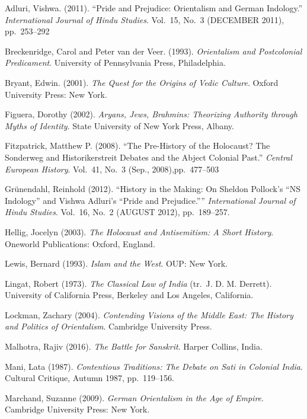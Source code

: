 \begin{thebibliography}{99}
\itemsep=2pt
Adluri, Vishwa. (2011). “Pride and Prejudice: Orientalism and German Indology.” {\sl International Journal of Hindu Studies}. Vol.~15, No.~3 (DECEMBER 2011), 
pp.~253--292

Breckenridge, Carol and Peter van der Veer. (1993). {\sl Orientalism and Postcolonial Predicament}. University of Pennsylvania Press, Philadelphia.

Bryant, Edwin. (2001). {\sl The Quest for the Origins of Vedic Culture}. Oxford University Press: New York.

Figuera, Dorothy (2002). {\sl Aryans, Jews, Brahmins: Theorizing Authority through Myths of Identity}. State University of New York Press, Albany.

Fitzpatrick, Matthew P. (2008). “The Pre-History of the Holocaust? The Sonderweg and Historikerstreit Debates and the Abject Colonial Past.” 
{\sl Central European History}. Vol.~41, No.~3 (Sep., 2008),\break pp.~477--503

Grünendahl, Reinhold (2012). “History in the Making: On Sheldon Pollock’s “NS Indology” and Vishwa Adluri’s “Pride and Prejudice.”” 
{\sl International Journal of Hindu Studies}. Vol.~16, No.~2 (AUGUST 2012), pp.~189--257.

Hellig, Jocelyn (2003). {\sl The Holocaust and Antisemitism: A Short History}. Oneworld Publications: Oxford, England.

Lewis, Bernard (1993). {\sl Islam and the West}. OUP: New York.

Lingat, Robert (1973). {\sl The Classical Law of India} (tr.\ J. D. M. Derrett). University of California Press, Berkeley and Los Angeles, California. 

Lockman, Zachary (2004). {\sl Contending Visions of the Middle East: The History and Politics of Orientalism}. Cambridge University Press.

Malhotra, Rajiv (2016). {\sl The Battle for Sanskrit}. Harper Collins, India.

Mani, Lata (1987). {\sl Contentious Traditions: The Debate on Sati in Colonial India}. Cultural Critique, Autumn 1987, pp.~119--156.

Marchand, Suzanne (2009). {\sl German Orientalism in the Age of Empire}. Cambridge University Press: New York.


\end{thebibliography}

